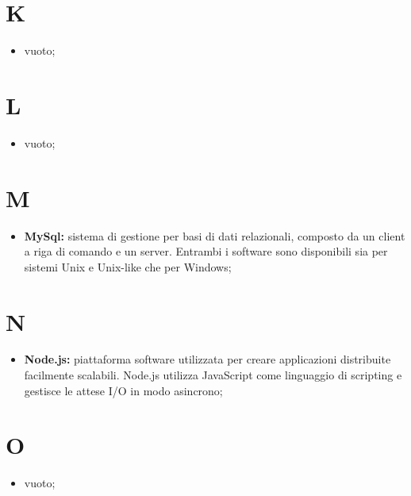%


\section*{K} %
\label{sec:k}
	\begin{itemize}
		\item vuoto;
	\end{itemize}
\pagebreak

\section*{L} %
\label{sec:l}
	\begin{itemize}
		\item vuoto;
	\end{itemize}
\pagebreak

\section*{M} %
\label{sec:m}
	\begin{itemize}
		\item \textbf{MySql:} sistema di gestione per basi di dati relazionali, composto da un client a riga di comando e un server. Entrambi i software sono disponibili sia per sistemi Unix e Unix-like che per Windows;
	\end{itemize}
\pagebreak

\section*{N} %
\label{sec:n}
	\begin{itemize}
		\item \textbf{Node.js:} piattaforma software utilizzata per creare applicazioni distribuite facilmente scalabili. Node.js utilizza JavaScript come linguaggio di scripting e gestisce le attese I/O in modo asincrono;
	\end{itemize}
\pagebreak

\section*{O} %
\label{sec:o}
	\begin{itemize}
		\item vuoto;
	\end{itemize}
\pagebreak
